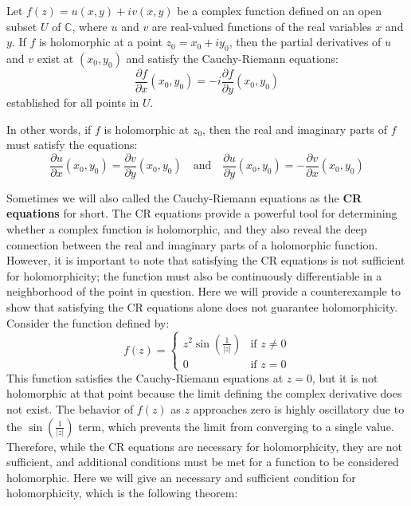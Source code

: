 \begin{theorem}
    Let $f(z) = u(x, y) + iv(x, y)$ be a complex function defined on an open subset $U$ of $\mathbb{C}$, where $u$ and $v$ are real-valued functions of the real variables $x$ and $y$. If $f$ is holomorphic at a point $z_0 = x_0 + iy_0$, then the partial derivatives of $u$ and $v$ exist at $(x_0, y_0)$ and satisfy the Cauchy-Riemann equations:
    \begin{equation}
        \frac{\partial f}{\partial x}(x_0, y_0) = -i \frac{\partial f}{\partial y}(x_0, y_0)
    \end{equation}
    established for all points in $U$.
\end{theorem}

In other words, if $f$ is holomorphic at $z_0$, then the real and imaginary parts of $f$ must satisfy the equations:
\begin{equation}
    \frac{\partial u}{\partial x}(x_0, y_0) = \frac{\partial v}{\partial y}(x_0, y_0) \quad \text{and} \quad \frac{\partial u}{\partial y}(x_0, y_0) = -\frac{\partial v}{\partial x}(x_0, y_0)
\end{equation}

Sometimes we will also called the Cauchy-Riemann equations as the \textbf{CR equations} for short. The CR equations provide a powerful tool for determining whether a complex function is holomorphic, and they also reveal the deep connection between the real and imaginary parts of a holomorphic function. However, it is important to note that satisfying the CR equations is not sufficient for holomorphicity; the function must also be continuously differentiable in a neighborhood of the point in question. Here we will provide a counterexample to show that satisfying the CR equations alone does not guarantee holomorphicity. Consider the function defined by:
\begin{equation}
    f(z) = \begin{cases}
        z^2 \sin\left(\frac{1}{|z|}\right) & \text{if } z \neq 0 \\
        0 & \text{if } z = 0
    \end{cases}
\end{equation}
This function satisfies the Cauchy-Riemann equations at $z = 0$, but it is not holomorphic at that point because the limit defining the complex derivative does not exist. The behavior of $f(z)$ as $z$ approaches zero is highly oscillatory due to the $\sin\left(\frac{1}{|z|}\right)$ term, which prevents the limit from converging to a single value. Therefore, while the CR equations are necessary for holomorphicity, they are not sufficient, and additional conditions must be met for a function to be considered holomorphic. Here we will give an necessary and sufficient condition for holomorphicity, which is the following theorem:

